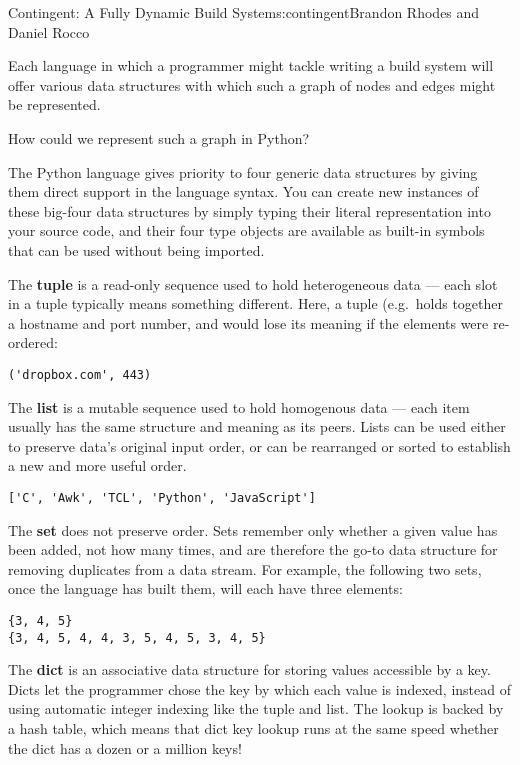 \begin{aosachapter}{Contingent: A Fully Dynamic Build System}{s:contingent}{Brandon Rhodes and Daniel Rocco}

Each language in which a programmer might tackle writing a build system
will offer various data structures with which such a graph of nodes and
edges might be represented.

How could we represent such a graph in Python?

The Python language gives priority to four generic data structures by
giving them direct support in the language syntax. You can create new
instances of these big-four data structures by simply typing their
literal representation into your source code, and their four type
objects are available as built-in symbols that can be used without being
imported.

The \textbf{tuple} is a read-only sequence used to hold heterogeneous
data --- each slot in a tuple typically means something different. Here,
a tuple (e.g.~holds together a hostname and port number, and would lose
its meaning if the elements were re-ordered:

\begin{verbatim}
('dropbox.com', 443)
\end{verbatim}

The \textbf{list} is a mutable sequence used to hold homogenous data ---
each item usually has the same structure and meaning as its peers. Lists
can be used either to preserve data's original input order, or can be
rearranged or sorted to establish a new and more useful order.

\begin{verbatim}
['C', 'Awk', 'TCL', 'Python', 'JavaScript']
\end{verbatim}

The \textbf{set} does not preserve order. Sets remember only whether a
given value has been added, not how many times, and are therefore the
go-to data structure for removing duplicates from a data stream. For
example, the following two sets, once the language has built them, will
each have three elements:

\begin{verbatim}
{3, 4, 5}
{3, 4, 5, 4, 4, 3, 5, 4, 5, 3, 4, 5}
\end{verbatim}

The \textbf{dict} is an associative data structure for storing values
accessible by a key. Dicts let the programmer chose the key by which
each value is indexed, instead of using automatic integer indexing like
the tuple and list. The lookup is backed by a hash table, which means
that dict key lookup runs at the same speed whether the dict has a dozen
or a million keys!


\end{aosachapter}
